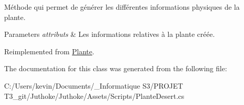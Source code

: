 Méthode qui permet de générer les différentes informations physiques de la plante. 
\begin{DoxyParams}{Parameters}
{\em attributs} & Les informations relatives à la plante créée. \\
\hline
\end{DoxyParams}


Reimplemented from \mbox{\hyperlink{class_plante_a57fe2932f99367a29150ac5280fda729}{Plante}}.



The documentation for this class was generated from the following file\+:\begin{DoxyCompactItemize}
\item 
C\+:/\+Users/kevin/\+Documents/\+\_\+\+Informatique S3/\+P\+R\+O\+J\+E\+T T3\+\_\+git/\+Juthoke/\+Juthoke/\+Assets/\+Scripts/Plante\+Desert.\+cs\end{DoxyCompactItemize}
